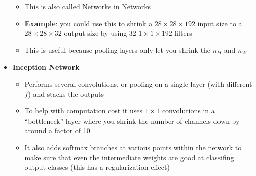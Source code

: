 \documentclass[12pt]{article}
\begin{document}
\begin{itemize}
\begin{itemize}
        \item This is also called Networks in Networks
        \item \textbf{Example}: you could use this to shrink a $28 \times 28 \times 192$ input size
        to a $28 \times 28 \times 32$ output size by using 32 $1 \times 1 \times 192$ filters
        \item This is useful because pooling layers only let you shrink the $n_H$ and $n_W$
    \end{itemize}
    \item \textbf{Inception Network}
    \begin{itemize}
        \item Performs several convolutions, or pooling on a single layer (with different $f$) and stacks the outputs
        \item To help with computation cost it uses $1 \times 1$ convolutions in a ``bottleneck'' layer where you shrink the
        number of channels down by around a factor of 10
        \item It also adds softmax branches at various points within the network to make sure that
        even the intermediate weights are good at classifing output classes (this has a regularization effect)
    \end{itemize}
  \end{itemize}
\end{document}
